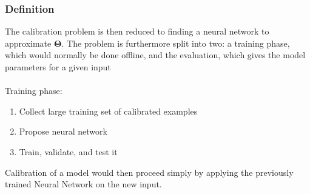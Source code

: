 \documentclass[bigger]{beamer}
\begin{document}
\begin{frame}
\frametitle{Definition} 
  \justifying
The calibration problem is then reduced to finding a neural network to approximate $\bm{\Theta}$. The problem is furthermore split into two: a training phase, which would normally be done offline, and the evaluation, which gives the model parameters for a given input
\\~\\
Training phase:
\begin{enumerate}
\item Collect large training set of calibrated examples
\item Propose neural network 
\item Train, validate, and test it
\end{enumerate}
Calibration of a model would then proceed simply by applying the previously trained Neural Network on the new input. 
\end{frame}
\end{document}
